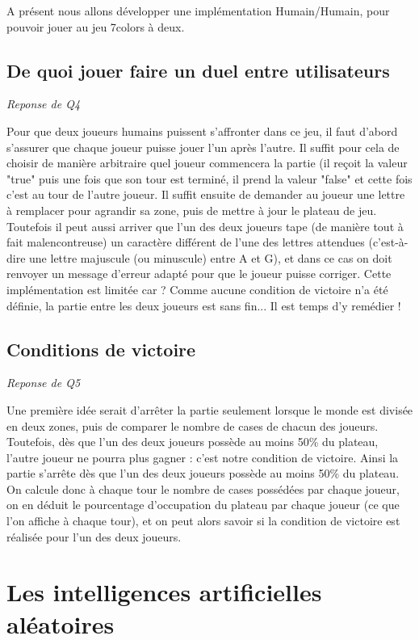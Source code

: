 \documentclass[a4paper,11pt]{article}
\begin{document}
A présent nous allons développer une implémentation Humain/Humain, pour 
pouvoir jouer au jeu 7colors à deux.

\subsection{De quoi jouer faire un duel entre utilisateurs}
\emph{Reponse de Q4}

Pour que deux joueurs humains puissent s'affronter dans ce jeu, il faut d'abord
s'assurer que chaque joueur puisse jouer l'un après l'autre. Il suffit pour cela 
de choisir de manière arbitraire quel joueur commencera la partie (il reçoit la
valeur "true" puis une fois que son tour est terminé, il prend la valeur "false" et
cette fois c'est au tour de l'autre joueur. Il suffit ensuite de demander au joueur
une lettre à remplacer pour agrandir sa zone, puis de mettre à jour le plateau de jeu.
Toutefois il peut aussi arriver que l'un des deux joueurs tape (de manière tout à 
fait malencontreuse) un caractère différent de l'une des lettres attendues 
(c'est-à-dire une lettre majuscule (ou minuscule) entre A et G), et dans ce cas on
doit renvoyer un message d'erreur adapté pour que le joueur puisse corriger. 
Cette implémentation est limitée car ?
Comme aucune condition de victoire n'a été définie, la partie entre les deux joueurs
est sans fin... Il est temps d'y remédier !  


\subsection{Conditions de victoire}
\emph{Reponse de Q5}

Une première idée serait d'arrêter la partie seulement lorsque le monde est
divisée en deux zones, puis de comparer le nombre de cases de chacun des joueurs.
Toutefois, dès que l'un des deux joueurs possède au moins 50\% du plateau, l'autre joueur
ne pourra plus gagner : c'est notre condition de victoire. 
Ainsi la partie s'arrête dès que l'un des deux joueurs possède au moins 50\% du plateau.
On calcule donc à chaque tour le nombre de cases possédées par chaque joueur, on en
déduit le pourcentage d'occupation du plateau par chaque joueur (ce que l'on affiche
à chaque tour), et on peut alors savoir si la condition de victoire est réalisée pour
l'un des deux joueurs.


\section{Les intelligences artificielles aléatoires}
\end{document}
